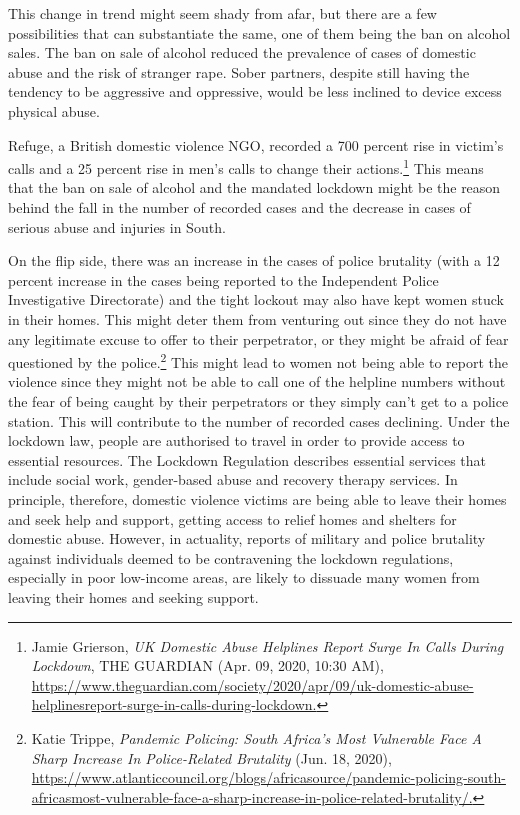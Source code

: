 \begin{multicols}{2}
\noi
This change in trend might seem shady from afar, but there are a few possibilities that can
substantiate the same, one of them being the ban on alcohol sales. The ban on sale of alcohol
reduced the prevalence of cases of domestic abuse and the risk of stranger rape. Sober
partners, despite still having the tendency to be aggressive and oppressive, would be less
inclined to device excess physical abuse.

\noi
Refuge, a British domestic violence NGO, recorded a 700 percent rise in victim's calls and a
25 percent rise in men's calls to change their actions.\footnote{Jamie Grierson, \textit{UK Domestic Abuse Helplines Report Surge In Calls During Lockdown}, THE GUARDIAN
(Apr. 09, 2020, 10:30 AM), \url{https://www.theguardian.com/society/2020/apr/09/uk-domestic-abuse-helplinesreport-surge-in-calls-during-lockdown.}} This means that the ban on sale of
alcohol and the mandated lockdown might be the reason behind the fall in the number of
recorded cases and the decrease in cases of serious abuse and injuries in South. 

\noi
On the flip side, there was an increase in the cases of police brutality (with a 12 percent
increase in the cases being reported to the Independent Police Investigative Directorate) and
the tight lockout may also have kept women stuck in their homes. This might deter them from
venturing out since they do not have any legitimate excuse to offer to their perpetrator, or
they might be afraid of fear questioned by the police.\footnote{Katie Trippe, \textit{Pandemic Policing: South Africa’s Most Vulnerable Face A Sharp Increase In Police-Related
Brutality} (Jun. 18, 2020), \url{https://www.atlanticcouncil.org/blogs/africasource/pandemic-policing-south-africasmost-vulnerable-face-a-sharp-increase-in-police-related-brutality/.}} This might lead to women not being
able to report the violence since they might not be able to call one of the helpline numbers
without the fear of being caught by their perpetrators or they simply can't get to a police
station. This will contribute to the number of recorded cases declining. Under the lockdown
law, people are authorised to travel in order to provide access to essential resources. The
Lockdown Regulation describes essential services that include social work, gender-based
abuse and recovery therapy services. In principle, therefore, domestic violence victims are
being able to leave their homes and seek help and support, getting access to relief homes and
shelters for domestic abuse. However, in actuality, reports of military and police brutality
against individuals deemed to be contravening the lockdown regulations, especially in poor
low-income areas, are likely to dissuade many women from leaving their homes and seeking
support.


\end{multicols}
